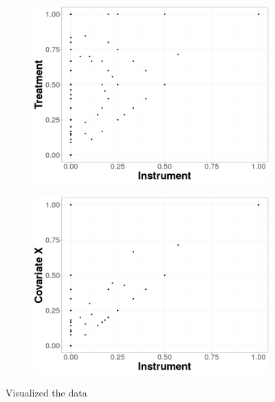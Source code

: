 \documentclass{scrartcl}
\begin{document}
\begin{figure}[h!]
  \begin{subfigure}{.5\textwidth}
    \centering
    \includegraphics[width=.95\linewidth]{replication/output/D_on_Z.png}
    \label{fig:sfig1}
  \end{subfigure}%
  \begin{subfigure}{.5\textwidth}
    \centering
    \includegraphics[width=.95\linewidth]{replication/output/X_on_Z.png}
    \label{fig:sfig2}
  \end{subfigure}
  \caption{Visualized the data}
  \label{fig:the_data}
\end{figure}
\end{document}
